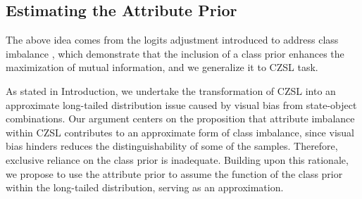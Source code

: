 \documentclass[letterpaper]{article} %
\theoremstyle{definition}
\begin{document}
\subsection{Estimating the Attribute Prior}\label{subsec.from_posteri_view}
The above idea comes from the logits adjustment \cite{menon2020long} introduced to address class imbalance \cite{johnson2019survey,japkowicz2002class}, which demonstrate that the inclusion of a class prior enhances the maximization of mutual information, and we generalize it to CZSL task.

As stated in Introduction, we undertake the transformation of CZSL into an approximate long-tailed distribution issue caused by visual bias from state-object combinations. Our argument centers on the proposition that attribute imbalance within CZSL contributes to an approximate form of class imbalance, since visual bias hinders reduces the distinguishability of some of the samples. Therefore, exclusive reliance on the class prior is inadequate. Building upon this rationale, we propose to use the attribute prior to assume the function of the class prior within the long-tailed distribution, serving as an approximation.
\end{document}

